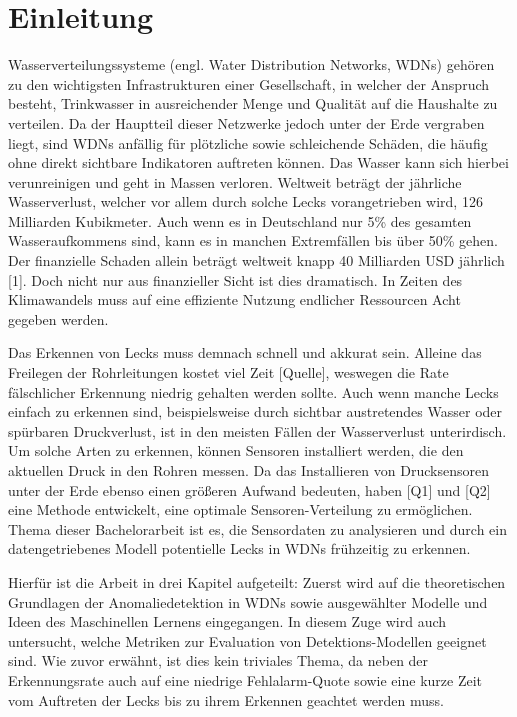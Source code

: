 \chapter{Einleitung}

Wasserverteilungssysteme (engl. Water Distribution Networks, WDNs) gehören zu den wichtigsten Infrastrukturen
 einer Gesellschaft, in welcher der Anspruch besteht, Trinkwasser in ausreichender Menge und Qualität auf die
 Haushalte zu verteilen. Da der Hauptteil dieser Netzwerke jedoch unter der Erde vergraben liegt, sind WDNs
 anfällig für plötzliche sowie schleichende Schäden, die häufig ohne direkt sichtbare Indikatoren
 auftreten können. Das Wasser kann sich hierbei verunreinigen und geht in Massen verloren. Weltweit beträgt
 der jährliche Wasserverlust, welcher vor allem durch solche Lecks vorangetrieben wird, 126 Milliarden
 Kubikmeter. Auch wenn es in Deutschland nur 5\% des gesamten Wasseraufkommens sind, kann es in manchen
 Extremfällen bis über 50\% gehen. Der finanzielle Schaden allein beträgt weltweit knapp 40 Milliarden USD
 jährlich [1]. Doch nicht nur aus finanzieller Sicht ist dies dramatisch. In Zeiten des Klimawandels muss auf
 eine effiziente Nutzung endlicher Ressourcen Acht gegeben werden.


Das Erkennen von Lecks muss demnach schnell und akkurat sein. Alleine das Freilegen der Rohrleitungen kostet viel
 Zeit [Quelle], weswegen die Rate fälschlicher Erkennung niedrig gehalten werden sollte. Auch wenn manche Lecks
 einfach zu erkennen sind, beispielsweise durch sichtbar austretendes Wasser oder spürbaren Druckverlust, ist in
 den meisten Fällen der Wasserverlust unterirdisch. Um solche Arten zu erkennen, können Sensoren installiert
 werden, die den aktuellen Druck in den Rohren messen. Da das Installieren von Drucksensoren unter der Erde
 ebenso einen größeren Aufwand bedeuten, haben [Q1] und [Q2] eine Methode entwickelt, eine optimale
 Sensoren-Verteilung zu ermöglichen.
Thema dieser Bachelorarbeit ist es, die Sensordaten zu analysieren und durch ein datengetriebenes Modell
potentielle Lecks in WDNs frühzeitig zu erkennen.


Hierfür ist die Arbeit in drei Kapitel aufgeteilt: Zuerst wird auf die theoretischen Grundlagen der
Anomaliedetektion in WDNs sowie ausgewählter Modelle und Ideen des Maschinellen Lernens eingegangen.
In diesem Zuge wird auch untersucht, welche Metriken zur Evaluation von Detektions-Modellen geeignet sind.
Wie zuvor erwähnt, ist dies kein triviales Thema, da neben der Erkennungsrate auch auf eine niedrige
 Fehlalarm-Quote sowie eine kurze Zeit vom Auftreten der Lecks bis zu ihrem Erkennen geachtet werden muss.


